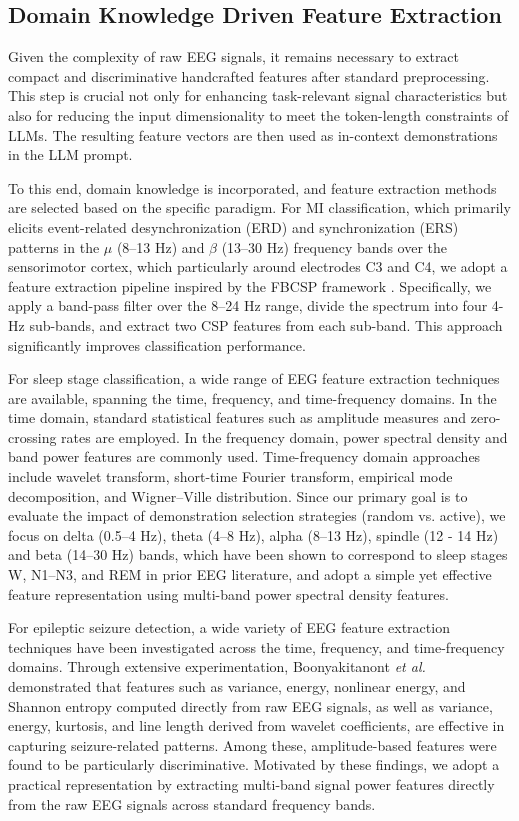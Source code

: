 \documentclass[journal,twocolumn]{IEEEtran}
\begin{document}
\subsection{Domain Knowledge Driven Feature Extraction}

Given the complexity of raw EEG signals, it remains necessary to extract compact and discriminative handcrafted features after standard preprocessing. This step is crucial not only for enhancing task-relevant signal characteristics but also for reducing the input dimensionality to meet the token-length constraints of LLMs. The resulting feature vectors are then used as in-context demonstrations in the LLM prompt.

To this end, domain knowledge is incorporated, and feature extraction methods are selected based on the specific paradigm. For MI classification, which primarily elicits event-related desynchronization (ERD) and synchronization (ERS) patterns in the $\mu$ (8–13 Hz) and $\beta$ (13–30 Hz) frequency bands over the sensorimotor cortex, which particularly around electrodes C3 and C4, we adopt a feature extraction pipeline inspired by the FBCSP framework \cite{4634130}. Specifically, we apply a band-pass filter over the 8–24 Hz range, divide the spectrum into four 4-Hz sub-bands, and extract two CSP features from each sub-band. This approach significantly improves classification performance.

For sleep stage classification, a wide range of EEG feature extraction techniques are available, spanning the time, frequency, and time-frequency domains. In the time domain, standard statistical features such as amplitude measures and zero-crossing rates are employed. In the frequency domain, power spectral density and band power features are commonly used. Time-frequency domain approaches include wavelet transform, short-time Fourier transform, empirical mode decomposition, and Wigner–Ville distribution. Since our primary goal is to evaluate the impact of demonstration selection strategies (random vs. active), we focus on delta (0.5–4 Hz), theta (4–8 Hz), alpha (8–13 Hz), spindle (12 - 14 Hz) and beta (14–30 Hz) bands, which have been shown to correspond to sleep stages W, N1–N3, and REM in prior EEG literature, and adopt a simple yet effective feature representation using multi-band power spectral density features.

For epileptic seizure detection, a wide variety of EEG feature extraction techniques have been investigated across the time, frequency, and time-frequency domains. Through extensive experimentation, Boonyakitanont \textit{et al.}~\cite{boonyakitanont2020review} demonstrated that features such as variance, energy, nonlinear energy, and Shannon entropy computed directly from raw EEG signals, as well as variance, energy, kurtosis, and line length derived from wavelet coefficients, are effective in capturing seizure-related patterns. Among these, amplitude-based features were found to be particularly discriminative. Motivated by these findings, we adopt a practical representation by extracting multi-band signal power features directly from the raw EEG signals across standard frequency bands.
\end{document}
